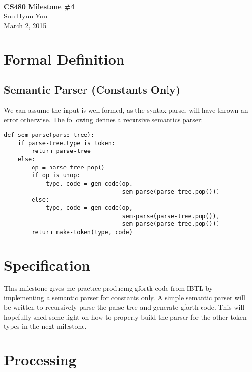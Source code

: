 \documentclass[12pt,letterpaper]{article}
\begin{document}
\fancyfoot{}
\begin{center}
    \hfill \\
    \vspace{4in}
    {\bf\Huge CS480 Milestone \#4 \\}
    \vspace{2in}
    {\Large Soo-Hyun Yoo \\ March 2, 2015}
\end{center}

\newpage
{}

\section*{Formal Definition}

\subsection*{Semantic Parser (Constants Only)}

We can assume the input is well-formed, as the syntax parser will have thrown
an error otherwise. The following defines a recursive semantics parser:

\begin{verbatim}
def sem-parse(parse-tree):
    if parse-tree.type is token:
        return parse-tree
    else:
        op = parse-tree.pop()
        if op is unop:
            type, code = gen-code(op,
                                  sem-parse(parse-tree.pop()))
        else:
            type, code = gen-code(op,
                                  sem-parse(parse-tree.pop()),
                                  sem-parse(parse-tree.pop()))
        return make-token(type, code)
\end{verbatim}

\section*{Specification}

This milestone gives me practice producing gforth code from IBTL by
implementing a semantic parser for constants only. A simple semantic parser
will be written to recursively parse the parse tree and generate gforth code.
This will hopefully shed some light on how to properly build the parser for the
other token types in the next milestone.

\section*{Processing}
\end{document}
